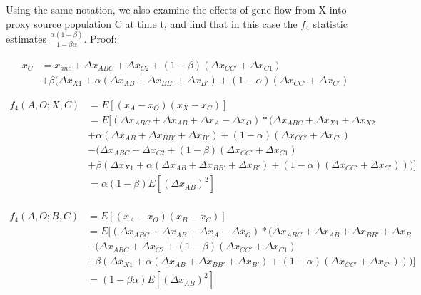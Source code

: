 \documentclass[12pt]{report}
\begin{document}
\begin{enumerate}
	Using the same notation, we also examine the effects of gene flow from X into proxy source population C at time t, and find that in this case the $f_4$ statistic estimates $\frac{\alpha(1 - \beta)}{1 - \beta\alpha}$. Proof:
	
	\begin{align*}
	x_C &= x_{anc} + \Delta{x_{ABC}} + \Delta{x_{C2}} + (1 - \beta)(\Delta{x_{CC'}} + \Delta{x_{C1}})\\
	&+ \beta(\Delta{x_{X1}} + \alpha(\Delta{x_{AB}} + \Delta{x_{BB'}} + \Delta{x_{B'}}) + (1 - \alpha)(\Delta{x_{CC'}} + \Delta{x_{C'}})
	\end{align*}

	\begin{align*}
	f_4(A,O;X,C) &= E[(x_A - x_O)(x_X - x_C)] \\
	&= E[(\Delta{x_{ABC}} + \Delta{x_{AB}} + \Delta{x_{A}} - \Delta{x_{O}})*(\Delta{x_{ABC}} + \Delta{x_{X1}} + \Delta{x_{X2}} \\
	&+ \alpha(\Delta{x_{AB}} + \Delta{x_{BB'}} + \Delta{x_{B'}}) + (1 - \alpha)(\Delta{x_{CC'}} + \Delta{x_{C'}}) \\
	&- (\Delta{x_{ABC}} + \Delta{x_{C2}} + (1 - \beta)(\Delta{x_{CC'}} + \Delta{x_{C1}})\\
	&+ \beta(\Delta{x_{X1}} + \alpha(\Delta{x_{AB}} + \Delta{x_{BB'}} + \Delta{x_{B'}}) + (1 - \alpha)(\Delta{x_{CC'}} + \Delta{x_{C'}})))]\\
	&=\alpha(1 - \beta)E[(\Delta{x_{AB}})^2]\\
	\end{align*}
	
	\begin{align*}
	f_4(A,O;B,C) &= E[(x_A - x_O)(x_B - x_C)] \\
	&= E[(\Delta{x_{ABC}} + \Delta{x_{AB}} + \Delta{x_{A}} - \Delta{x_{O}})*(\Delta{x_{ABC}} + \Delta{x_{AB}} + \Delta{x_{BB'}} + \Delta{x_{B}} \\
	& - (\Delta{x_{ABC}} + \Delta{x_{C2}} + (1 - \beta)(\Delta{x_{CC'}} + \Delta{x_{C1}})\\
	&+ \beta(\Delta{x_{X1}} + \alpha(\Delta{x_{AB}} + \Delta{x_{BB'}} + \Delta{x_{B'}}) + (1 - \alpha)(\Delta{x_{CC'}} + \Delta{x_{C'}})))]\\
	&=(1 - \beta\alpha)E[(\Delta{x_{AB}})^2]
	\end{align*}
	

\end{enumerate}
\end{document}
